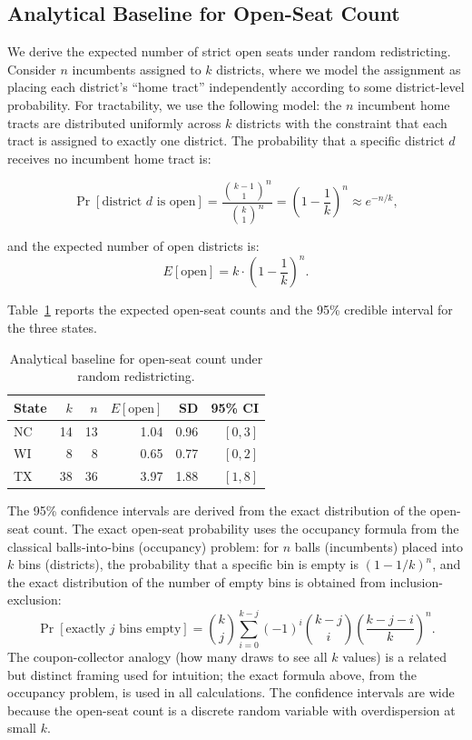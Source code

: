 \label{sec:methodology}

\subsection{Analytical Baseline for Open-Seat Count}

We derive the expected number of strict open seats under random redistricting.
Consider $n$ incumbents assigned to $k$ districts, where we model the assignment
as placing each district's ``home tract'' independently according to some district-level
probability. For tractability, we use the following model: the $n$ incumbent home tracts
are distributed uniformly across $k$ districts with the constraint that each tract
is assigned to exactly one district. The probability that a specific district $d$
receives no incumbent home tract is:

\[
  \Pr[\text{district } d \text{ is open}] = \frac{\binom{k-1}{1}^n}{\binom{k}{1}^n}
  = \left(1 - \frac{1}{k}\right)^n \approx e^{-n/k},
\]

and the expected number of open districts is:
\[
  E[\text{open}] = k \cdot \left(1 - \frac{1}{k}\right)^n.
\]

Table~\ref{tab:open-baseline} reports the expected open-seat counts and the
95\% credible interval for the three states.

\begin{table}[ht]
\centering
\caption{Analytical baseline for open-seat count under random redistricting.}
\label{tab:open-baseline}
\begin{tabular}{l r r r r r}
\toprule
State & $k$ & $n$ & $E[\text{open}]$ & SD & 95\% CI \\
\midrule
NC & 14 & 13 & 1.04 & 0.96 & $[0, 3]$ \\
WI & 8  & 8  & 0.65 & 0.77 & $[0, 2]$ \\
TX & 38 & 36 & 3.97 & 1.88 & $[1, 8]$ \\
\bottomrule
\end{tabular}
\end{table}

The 95\% confidence intervals are derived from the exact distribution of the
open-seat count. The exact open-seat probability uses the occupancy formula from
the classical balls-into-bins (occupancy) problem: for $n$ balls (incumbents) placed
into $k$ bins (districts), the probability that a specific bin is empty is
$(1-1/k)^n$, and the exact distribution of the number of empty bins is obtained
from inclusion-exclusion:
\[
  \Pr[\text{exactly } j \text{ bins empty}]
    = \binom{k}{j} \sum_{i=0}^{k-j} (-1)^i \binom{k-j}{i} \left(\frac{k-j-i}{k}\right)^n.
\]
The coupon-collector analogy (how many draws to see all $k$ values) is a related
but distinct framing used for intuition; the exact formula above, from the occupancy
problem, is used in all calculations. The confidence intervals are wide because the
open-seat count is a discrete random variable with overdispersion at small $k$.

